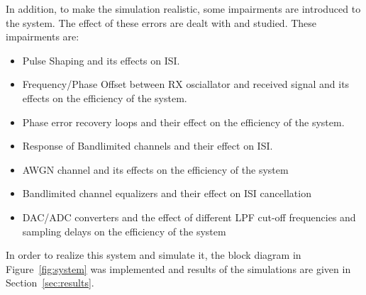 \documentclass[]{article}
\begin{document}
In addition, to make the simulation realistic, some impairments are introduced to the system.  The effect of these errors are dealt with and studied.  These impairments are:
\begin{itemize}
\item Pulse Shaping and its effects on ISI.
\item Frequency/Phase Offset between RX osciallator and received signal and its effects on the efficiency of the system.
\item Phase error recovery loops and their effect on the efficiency of the system.
\item Response of Bandlimited channels and their effect on ISI.
\item AWGN channel and its effects on the efficiency of the system
\item Bandlimited channel equalizers and their effect on ISI cancellation
\item DAC/ADC converters and the effect of different LPF cut-off frequencies and sampling delays on the efficiency of the system  
\end{itemize}

In order to realize this system and simulate it, the block diagram in Figure~\ref{fig:system} was implemented and results of the simulations are given in Section~\ref{sec:results}.
\end{document}
